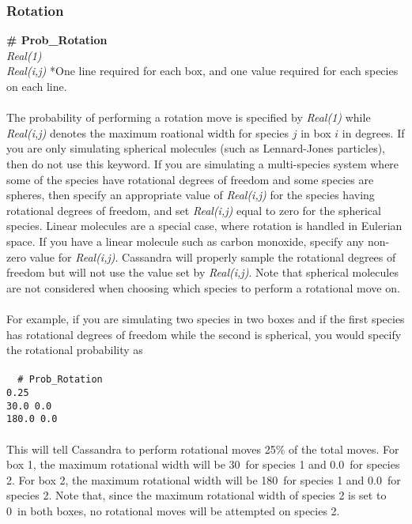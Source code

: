 \subsubsection{Rotation}
{\bf \# Prob\_Rotation}\\
{\it Real(1)} \\
{\it Real(i,j) } *One line required for each box, and one value required for each species on each line. \\ \\
%
The probability of performing a rotation move is specified by 
{\it Real(1)} while {\it Real(i,j)} denotes the maximum roational width
for  species $j$ in  box $i$ in degrees. If you are only
simulating spherical molecules (such as Lennard-Jones particles), then
do not use this keyword. If you are simulating a multi-species system
where some of the species have rotational degrees of freedom and some
species are spheres, then specify an appropriate value of 
{\it  Real(i,j)} for the species having rotational degrees of freedom, and
set {\it Real(i,j)} equal to zero for the spherical species. Linear
molecules are a special case, where rotation is handled in Eulerian
space. If you have a linear molecule such as carbon monoxide, specify
any non-zero value for {\it Real(i,j)}. Cassandra will properly sample
the rotational degrees of freedom but will not use the value set by
{\it Real(i,j)}. Note that spherical molecules are not considered when
choosing which species to perform a rotational move on.
\\ \\
For example, if you are simulating two species in two boxes and if the first species has rotational degrees
of freedom while the second is spherical, you would specify
the rotational probability as \\ \\
\texttt{
{ \# Prob\_Rotation} \\
 0.25 \\
30.0 0.0\\
180.0 0.0} \\
\\ 
%
This will tell Cassandra to perform rotational moves 25\% of the total moves. For box 1,
the maximum rotational width will be 30\degree\ for species 1 and 0.0\degree\
for species 2. For box 2, the maximum rotational width will be 180\degree\ for
species 1 and 0.0\degree\ for species 2. Note that, since the maximum rotational
 width of species 2 is set to 0\degree\ in both boxes, no rotational moves will be
 attempted on species 2. \\ \\
